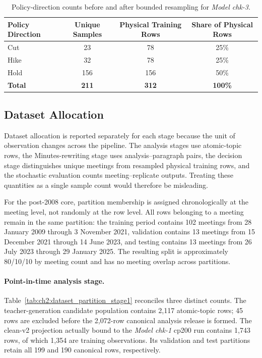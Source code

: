 \begin{table}[H]
    \centering
    \scriptsize
    \begin{tabular}{lccc}
        \toprule
        \textbf{Policy Direction}
        & \textbf{Unique Samples}
        & \textbf{Physical Training Rows}
        & \textbf{Share of Physical Rows} \\
        \midrule
        Cut  & 23  & 78  & 25\% \\
        Hike & 32  & 78  & 25\% \\
        Hold & 156 & 156 & 50\% \\
        \midrule
        \textbf{Total}
        & \textbf{211}
        & \textbf{312}
        & \textbf{100\%} \\
        \bottomrule
    \end{tabular}
    \caption{Policy-direction counts before and after bounded resampling for \textit{Model chk-3}.}
    \label{tab:ch2:chk3_bounded_resampling}
\end{table}





\subsection*{Dataset Allocation}

Dataset allocation is reported separately for each stage because the unit of
observation changes across the pipeline.  The analysis stages use atomic-topic
rows, the Minutes-rewriting stage uses analysis--paragraph pairs, the decision
stage distinguishes unique meetings from resampled physical training rows, and
the stochastic evaluation counts meeting--replicate outputs.  Treating these
quantities as a single sample count would therefore be misleading.

For the post-2008 core, partition membership is assigned chronologically at the
meeting level, not randomly at the row level.  All rows belonging to a meeting
remain in the same partition: the training period contains 102 meetings from
28 January 2009 through 3 November 2021, validation contains 13 meetings from
15 December 2021 through 14 June 2023, and testing contains 13 meetings from
26 July 2023 through 29 January 2025.  The resulting split is approximately
80/10/10 by meeting count and has no meeting overlap across partitions.

\paragraph*{Point-in-time analysis stage.}
Table~\ref{tab:ch2:dataset_partition_stage1} reconciles three distinct counts.
The teacher-generation candidate population contains 2,117 atomic-topic rows;
45 rows are excluded before the 2,072-row canonical analysis release is
formed.  The clean-v2 projection actually bound to the \textit{Model chk-1}
cp200 run contains 1,743 rows, of which 1,354 are training observations.  Its
validation and test partitions retain all 199 and 190 canonical rows,
respectively.

